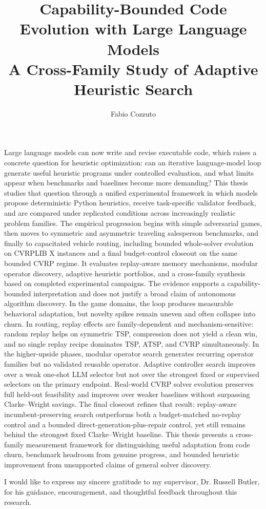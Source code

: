 \documentclass[11pt]{buthesis}
\title{Capability-Bounded Code Evolution with Large Language Models\\
A Cross-Family Study of Adaptive Heuristic Search}
\author{Fabio Cozzuto}
\numberwithin{equation}{chapter}
\begin{document}
\beforepreface

Large language models can now write and revise executable code, which raises a concrete question
for heuristic optimization: can an iterative language-model loop generate useful heuristic
programs under controlled evaluation, and what limits appear when benchmarks and baselines become
more demanding? This thesis studies that question through a unified experimental framework
in which models propose deterministic Python heuristics, receive task-specific validator feedback,
and are compared under replicated conditions across increasingly realistic problem families. The
empirical progression begins with simple adversarial games, then moves to symmetric and
asymmetric traveling salesperson benchmarks, and finally to capacitated vehicle routing,
including bounded whole-solver evolution on CVRPLIB X instances and a final budget-control
closeout on the same bounded CVRP regime. It evaluates replay-aware memory
mechanisms, modular operator discovery, adaptive heuristic portfolios, and a cross-family
synthesis based on completed experimental campaigns. The evidence supports a
capability-bounded interpretation and does not justify a broad claim of autonomous algorithm discovery. In
the game domains, the loop produces measurable behavioral adaptation, but novelty spikes remain uneven
and often collapse into churn. In routing, replay effects are family-dependent and
mechanism-sensitive: random replay helps on symmetric TSP, compression does not yield a clean
win, and no single replay recipe dominates TSP, ATSP, and CVRP simultaneously. In the
higher-upside phases, modular operator search generates recurring operator families but no
validated reusable operator. Adaptive controller search improves over a weak one-shot LLM
selector but not over the strongest fixed or supervised selectors on the primary endpoint.
Real-world CVRP solver evolution preserves full held-out feasibility and improves over weaker
baselines without surpassing Clarke--Wright savings. The final closeout refines that result:
replay-aware incumbent-preserving search outperforms both a budget-matched no-replay control and
a bounded direct-generation-plus-repair control, yet still remains behind the strongest fixed
Clarke--Wright baseline. This thesis presents a cross-family measurement framework for
distinguishing useful adaptation from code churn, benchmark headroom from genuine progress, and
bounded heuristic improvement from unsupported claims of general solver discovery.

I would like to express my sincere gratitude to my supervisor, Dr. Russell Butler,
for his guidance, encouragement, and thoughtful feedback throughout this research.
\end{document}
